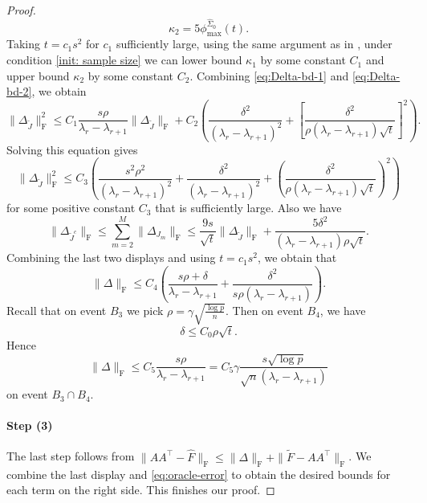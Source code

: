 \documentclass[11pt]{article}
\newcommand{\nb}[1]{\textcolor{orange}{\texttt{[#1]}}}
\newcommand{\0}{{\mathbf{0}}}
\newcommand{\tF}{{\widetilde{F}}}
\newcommand{\tJ}{{\widetilde{J}}}
\begin{document}
\begin{proof}
\begin{equation*}
    \kappa_2=5\phi_{\max}^{\widehat{\Sigma}_0}(t).
\end{equation*}
Taking $t=c_1s^2$ for $c_1$ sufficiently large, using the same argument as in \cite{gao2017sparse}, under condition \eqref{init: sample size} we can lower bound $\kappa_1$ by some constant $C_1$ and upper bound $\kappa_2$ by some constant $C_2$. 
Combining \eqref{eq:Delta-bd-1} and \eqref{eq:Delta-bd-2}, we obtain
\begin{equation*}
\|\Delta_{\tJ}\|_\mathrm{F}^2\leq C_1\frac{s\rho}{\lambda_r-\lambda_{r+1}}\|\Delta_{\tJ}\|_\mathrm{F}
+C_2\left(\frac{\delta^2}{(\lambda_r-\lambda_{r+1})^2}
+\left[\frac{\delta^2}{\rho(\lambda_r-\lambda_{r+1})\sqrt{t}}\right]^2\right).
\end{equation*}
Solving this equation gives \begin{equation*}
    \|\Delta_{\tJ}\|_\mathrm{F}^2\leq C_3\left(\frac{s^2\rho^2}{(\lambda_r-\lambda_{r+1})^2}+\frac{\delta^2}{(\lambda_r-\lambda_{r+1})^2}+\left(\frac{\delta^2}{\rho(\lambda_r-\lambda_{r+1})\sqrt{t}}\right)^2\right)
\end{equation*}
for some positive constant $C_3$ that is sufficiently large. 
Also we have\begin{equation*}
    \|\Delta_{{\tJ}^c}\|_\mathrm{F}\leq \sum_{m=2}^M\|\Delta_{J_m}\|_\mathrm{F}\leq  \frac{9s}{\sqrt{t}}\|\Delta_{\tJ}\|_\mathrm{F}+\frac{5\delta^2}{(\lambda_r-\lambda_{r+1})\rho\sqrt{t} }.
\end{equation*}
Combining the last two displays and using $t = c_1 s^2$, we obtain that
\begin{equation*}
\|\Delta\|_{\mathrm{F}} 
\leq C_4 \left( \frac{s\rho + \delta}{\lambda_r - \lambda_{r+1}} + 
\frac{\delta^2}{ s \rho  (\lambda_r - \lambda_{r+1}) } \right).
\end{equation*}
Recall that on event $B_3$ we pick $\rho=\gamma\sqrt{\frac{\log p}{n}}$. 
Then on event $B_4$,  we have \begin{equation*}
    \delta\leq C_0\rho\sqrt{t}.
\end{equation*}
 Hence \begin{equation*}
    \|\Delta\|_\mathrm{F}\leq C_5\frac{s\rho}{\lambda_r-\lambda_{r+1}}
      =C_5\gamma\frac{s\sqrt{\log p}}{\sqrt{n}(\lambda_r-\lambda_{r+1})}
\end{equation*}
on event $B_3\cap B_4$.  

\paragraph{Step (3)} The last step follows from $\|AA^\top  -\widehat{F}\|_\mathrm{F}\leq\|\Delta\|_\mathrm{F}+\|\tF-AA^\top  \|_\mathrm{F}$. 
We combine the last display and \eqref{eq:oracle-error} to obtain the desired bounds for each term on the right side. 
This finishes our proof.
\end{proof}
\end{document}
